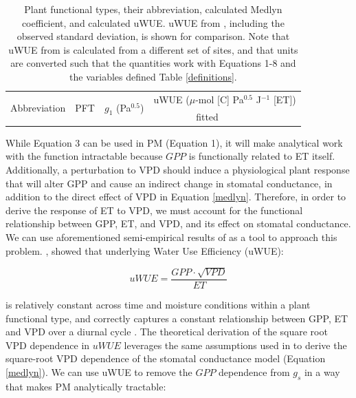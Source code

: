 \begin{table}
  \caption{Plant functional types, their abbreviation, calculated
    Medlyn coefficient, and calculated uWUE. uWUE from
    \citet{Zhou_2015}, including the observed standard deviation, is
    shown for comparison. Note that uWUE from \citet{Zhou_2015} is
    calculated from a different set of sites, and that units are
    converted such that the quantities work with Equations 1-8 and the
    variables defined Table \ref{definitions}.}
  \small
  \label{pft}
  \centering
  \begin{tabular}{l c c @{\qquad} c c}
    \hline
    \multirow{2}[3]{*}{Abbreviation} & \multirow{2}[3]{*}{PFT} & \multirow{2}[3]{*}{$g_1$ (Pa$^{0.5}$)} & \multicolumn{2}{c}{uWUE ($\mu$-mol [C] Pa$^{0.5}$ J$^{-1}$ [ET])}  \\
    \cmidrule{4-5}

                                     & & & fitted & \citet{Zhou_2015} \\

    \hline
    
    \hline
  \end{tabular}
\end{table}

While Equation 3 can be used in PM (Equation 1), it will make
analytical work with the function intractable because $GPP$ is
functionally related to ET itself. Additionally, a perturbation to VPD
should induce a physiological plant response that will alter GPP and
cause an indirect change in stomatal conductance, in addition to the
direct effect of VPD in Equation \ref{medlyn}. Therefore, in order to
derive the response of ET to VPD, we must account for the functional
relationship between GPP, ET, and VPD, and its effect on stomatal
conductance. We can use aforementioned semi-empirical results of
\citet{Zhou_2015} as a tool to approach this
problem. \citet{Zhou_2015}, showed that  underlying Water Use
Efficiency (uWUE):

  \begin{equation}
    uWUE = \frac{GPP \cdot \sqrt{VPD}}{ET}
    \label{uwue}
  \end{equation}

is relatively constant across time and moisture conditions within a
plant functional type, and correctly captures a constant relationship
between GPP, ET and VPD over a diurnal cycle \citep{Zhou_2014}. The
theoretical derivation of the square root VPD dependence in $uWUE$
leverages the same assumptions used in \cite{MEDLYN_2011} to derive the
square-root VPD dependence of the stomatal conductance model (Equation
\ref{medlyn}).  We can use uWUE to remove the $GPP$ dependence from
$g_s$ in a way that makes PM analytically tractable:

